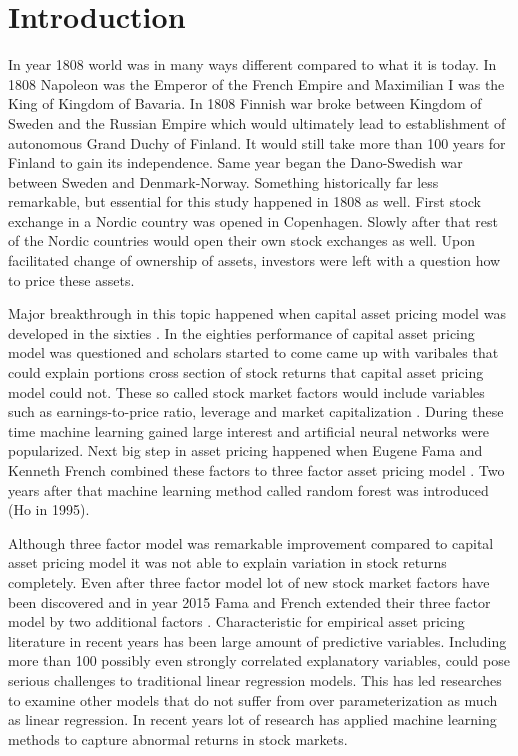 \documentclass{article}
\begin{document}
\section{Introduction} \label{Introduction}
In year 1808 world was in many ways different compared to what it is today. In 1808 Napoleon was the Emperor of the French Empire and Maximilian I was the King of Kingdom of Bavaria. In 1808 Finnish war broke between Kingdom of Sweden and the Russian Empire which would ultimately lead to establishment of autonomous Grand Duchy of Finland. It would still take more than 100 years for Finland to gain its independence. Same year began the Dano-Swedish war between Sweden and Denmark-Norway. Something historically far less remarkable, but essential for this study happened in 1808 as well. First stock exchange in a Nordic country was opened in Copenhagen. Slowly after that rest of the Nordic countries would open their own stock exchanges as well. Upon facilitated change of ownership of assets, investors were left with a question how to price these assets. \par

Major breakthrough in this topic happened when capital asset pricing model was developed in the sixties \cite{Sharpe1964, Lintner1965}. In the eighties performance of capital asset pricing model was questioned and scholars started to come came up with varibales that could explain portions cross section of stock returns that capital asset pricing model could not. These so called stock market factors would include variables such as earnings-to-price ratio, leverage and market capitalization \cite{Basu1977, Bhandari1988, BANZ1981}. During these time machine learning gained large interest and artificial neural networks were popularized. Next big step in asset pricing happened when Eugene Fama and Kenneth French combined these factors to three factor asset pricing model \cite{FAMA19933}. Two years after that machine learning method called random forest was introduced (Ho in 1995). \par

Although three factor model was remarkable improvement compared to capital asset pricing model it was not able to explain variation in stock returns completely. Even after three factor model lot of new stock market factors have been discovered and in year 2015 Fama and French extended their three factor model by two additional factors \cite{FAMA20151}. Characteristic for empirical asset pricing literature in recent years has been large amount of predictive variables. Including more than 100 possibly even strongly correlated explanatory variables, could pose serious challenges to traditional linear regression models. This has led researches to examine other models
that do not suffer from over parameterization as much as linear regression. In recent years lot of research has applied machine learning methods to capture abnormal returns in stock markets.  \par
\end{document}
